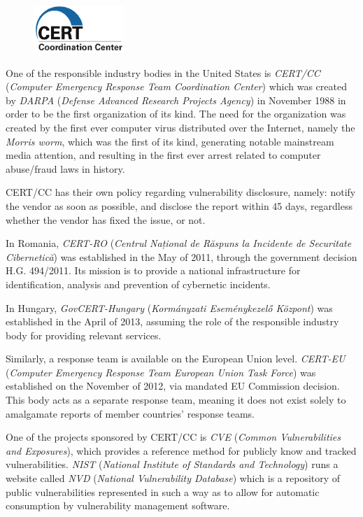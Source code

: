 \documentclass[a4paper,12pt]{article}
\begin{document}
	\begin{figure}
		\vspace{-11pt}
		\centering
		\includegraphics[scale=0.70]{cert.png}
	\end{figure}
	
	One of the responsible industry bodies in the United States is \textit{CERT/CC} (\textit{Computer Emergency Response Team Coordination Center}) which was created by \textit{DARPA} (\textit{Defense Advanced Research Projects Agency}) in November 1988 in order to be the first organization of its kind. The need for the organization was created by the first ever computer virus distributed over the Internet, namely the \textit{Morris worm}\cite{cert15}, which was the first of its kind, generating notable mainstream media attention, and resulting in the first ever arrest related to computer abuse/fraud laws in history.
	
	CERT/CC has their own policy regarding vulnerability disclosure, namely: notify the vendor as soon as possible, and disclose the report within 45 days, regardless whether the vendor has fixed the issue, or not.
	
	In Romania, \textit{CERT-RO} (\textit{Centrul Național de Răspuns la Incidente de Securitate Cibernetică}) was established in the May of 2011, through the government decision H.G. 494/2011\cite{certro12}. Its mission is to provide a national infrastructure for identification, analysis and prevention of cybernetic incidents.
	
	In Hungary, \textit{GovCERT-Hungary} (\textit{Kormányzati Eseménykezelő Központ}) was established in the April of 2013\cite{certhu13}, assuming the role of the responsible industry body for providing relevant services.
	
	Similarly, a response team is available on the European Union level. \textit{CERT-EU} (\textit{Computer Emergency Response Team European Union Task Force}) was established on the November of 2012, via mandated EU Commission decision. This body acts as a separate response team, meaning it does not exist solely to amalgamate reports of member countries' response teams.
	
	One of the projects sponsored by CERT/CC is \textit{CVE} (\textit{Common Vulnerabilities and Exposures}), which provides a reference method for publicly know and tracked vulnerabilities. \textit{NIST} (\textit{National Institute of Standards and Technology}) runs a website called \textit{NVD} (\textit{National Vulnerability Database}) which is a repository of public vulnerabilities represented in such a way as to allow for automatic consumption by vulnerability management software\cite{nvd15}.
	
\end{document}
